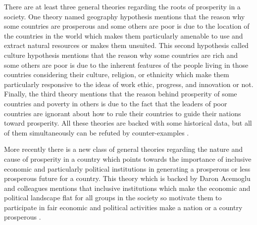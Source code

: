\documentclass{article}
\begin{document}
There are at least three general theories regarding the roots of prosperity in a society. One theory named geography hypothesis mentions that the reason why some countries are prosperous and some others are poor is due to the location of the countries in the world which makes them particularly amenable to use and extract natural resources or makes them unsuited. This second hypothesis called culture hypothesis mentions that the reason why some countries are rich and some others are poor is due to the inherent features of the people living in those countries considering their culture, religion, or ethnicity which make them particularly responsive to the ideas of work ethic, progress, and innovation or not. Finally, the third theory mentions that the reason behind prosperity of some countries and poverty in others is due to the fact that the leaders of poor countries are ignorant about how to rule their countries to guide their nations toward prosperity. All these theories are backed with some historical data, but all of them simultaneously can be refuted by counter-examples \citep{Acemoglu2012}.

More recently there is a new class of general theories regarding the nature and cause of prosperity in a country which points towards the importance of inclusive economic and particularly political institutions in generating a prosperous or less prosperous future for a country. This theory which is backed by Daron Acemoglu and colleagues mentions that inclusive institutions which make the economic and political landscape flat for all groups in the society \textendash so motivate them to participate in fair economic and political activities \textendash make a nation or a country prosperous \citep{Acemoglu2011, Acemoglu2012, Acemoglu2015a, Acemoglu2020, Acemoglu2022a, Acemoglu2022b}.
\end{document}
